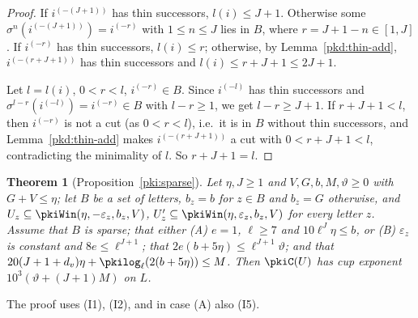 \documentclass[10pt]{amsart}
\newtheorem{theorem}{Theorem}[section]
\theoremstyle{definition}
\theoremstyle{remark}
\begin{document}
\begin{proof}
If $i^{(-(J+1))}$ has thin successors, $l(i)\le J+1$. Otherwise some
$\sigma^n(i^{(-(J+1))})=i^{(-r)}$ with $1\le n\le J$ lies in $B$, where $r=J+1-n\in[1,J]$. If
$i^{(-r)}$ has thin successors, $l(i)\le r$; otherwise, by Lemma~\ref{pkd:thin-add},
$i^{(-(r+J+1))}$ has thin successors and $l(i)\le r+J+1\le2J+1$.

Let $l=l(i)$, $0<r<l$, $i^{(-r)}\in B$. Since $i^{(-l)}$ has thin successors and
$\sigma^{l-r}(i^{(-l)})=i^{(-r)}\in B$ with $l-r\ge1$, we get $l-r\ge J+1$. If $r+J+1<l$, then
$i^{(-r)}$ is not a cut (as $0<r<l$), i.e.\ it is in $B$ without thin successors, and
Lemma~\ref{pkd:thin-add} makes $i^{(-(r+J+1))}$ a cut with $0<r+J+1<l$, contradicting the minimality
of $l$. So $r+J+1=l$.
\end{proof}

\begin{theorem}[Proposition~\ref{pki:sparse}]\label{pkd:sparse}
Let $\eta,J\ge1$ and $V,G,b,M,\vartheta\ge0$ with $G+V\le\eta$; let $B$ be a set of letters, $b_z=b$
for $z\in B$ and $b_z=G$ otherwise, and $U_z\subseteq\pkiWin(\eta,-\varepsilon_z,b_z,V)$,
$U'_z\subseteq\pkiWin(\eta,\varepsilon_z,b_z,V)$ for every letter $z$. Assume that $B$ is sparse; that
either (A) $e=1$, $\ell\ge7$ and $10\ell^J\eta\le b$, or (B) $\varepsilon_z$ is constant and
$8e\le\ell^{J+1}$; that $2e(b+5\eta)\le\ell^{J+1}\vartheta$; and that
$20(J+1+d_v)\eta+\pkilog_\ell(2(b+5\eta))\le M$. Then $\pkiC(U)$ has cup exponent
$10^3(\vartheta+(J+1)M)$ on $L$.
\end{theorem}

The proof uses (I1), (I2), and in case (A) also (I5).
\end{document}
